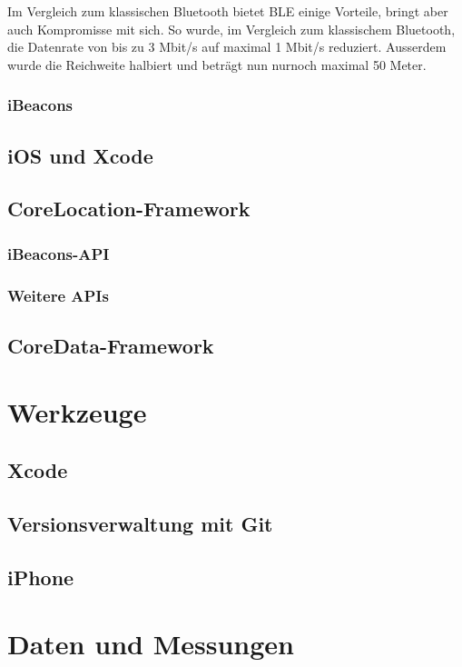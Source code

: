 \documentclass[liststotoc,a4paper, 12pt]{scrartcl}
\begin{document}
Im Vergleich zum klassischen Bluetooth bietet BLE einige Vorteile, bringt aber auch Kompromisse mit sich.
So wurde, im Vergleich zum klassischem Bluetooth, die Datenrate von bis zu 3 Mbit/s auf maximal 1 Mbit/s reduziert. Ausserdem wurde die Reichweite halbiert und beträgt nun nurnoch maximal 50 Meter.




\subsubsection{iBeacons}

\subsection{iOS und Xcode}

\subsection{CoreLocation-Framework}
\subsubsection{iBeacons-API}
\subsubsection{Weitere APIs}

\subsection{CoreData-Framework}


\section{Werkzeuge}
\subsection{Xcode}
\subsection{Versionsverwaltung mit Git}
\subsection{iPhone}

\section{Daten und Messungen}
\end{document}
